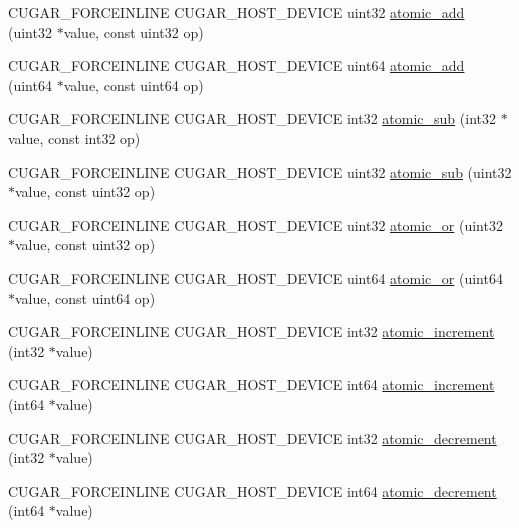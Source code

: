\begin{DoxyCompactItemize}
\item 
C\+U\+G\+A\+R\+\_\+\+F\+O\+R\+C\+E\+I\+N\+L\+I\+NE C\+U\+G\+A\+R\+\_\+\+H\+O\+S\+T\+\_\+\+D\+E\+V\+I\+CE uint32 \hyperlink{group___atomics_ga130aea0c6d0c91af08bea4b52d6a8208}{atomic\+\_\+add} (uint32 $\ast$value, const uint32 op)
\item 
C\+U\+G\+A\+R\+\_\+\+F\+O\+R\+C\+E\+I\+N\+L\+I\+NE C\+U\+G\+A\+R\+\_\+\+H\+O\+S\+T\+\_\+\+D\+E\+V\+I\+CE uint64 \hyperlink{group___atomics_gaed434d4f310d826a6e39932269de15c4}{atomic\+\_\+add} (uint64 $\ast$value, const uint64 op)
\item 
C\+U\+G\+A\+R\+\_\+\+F\+O\+R\+C\+E\+I\+N\+L\+I\+NE C\+U\+G\+A\+R\+\_\+\+H\+O\+S\+T\+\_\+\+D\+E\+V\+I\+CE int32 \hyperlink{group___atomics_ga3efc1d5c63f30d1ee11887f76744bafe}{atomic\+\_\+sub} (int32 $\ast$value, const int32 op)
\item 
C\+U\+G\+A\+R\+\_\+\+F\+O\+R\+C\+E\+I\+N\+L\+I\+NE C\+U\+G\+A\+R\+\_\+\+H\+O\+S\+T\+\_\+\+D\+E\+V\+I\+CE uint32 \hyperlink{group___atomics_ga9d9415fae4e05362c8d6f43d2fd61c60}{atomic\+\_\+sub} (uint32 $\ast$value, const uint32 op)
\item 
C\+U\+G\+A\+R\+\_\+\+F\+O\+R\+C\+E\+I\+N\+L\+I\+NE C\+U\+G\+A\+R\+\_\+\+H\+O\+S\+T\+\_\+\+D\+E\+V\+I\+CE uint32 \hyperlink{group___atomics_ga4b242819dd9c2a9986e0ea35b4883f67}{atomic\+\_\+or} (uint32 $\ast$value, const uint32 op)
\item 
C\+U\+G\+A\+R\+\_\+\+F\+O\+R\+C\+E\+I\+N\+L\+I\+NE C\+U\+G\+A\+R\+\_\+\+H\+O\+S\+T\+\_\+\+D\+E\+V\+I\+CE uint64 \hyperlink{group___atomics_ga5d15edb3c64f3cde839eb76c54aacf7c}{atomic\+\_\+or} (uint64 $\ast$value, const uint64 op)
\item 
C\+U\+G\+A\+R\+\_\+\+F\+O\+R\+C\+E\+I\+N\+L\+I\+NE C\+U\+G\+A\+R\+\_\+\+H\+O\+S\+T\+\_\+\+D\+E\+V\+I\+CE int32 \hyperlink{group___atomics_ga3034bbde9594dc3c4894fe31ad5a0b3c}{atomic\+\_\+increment} (int32 $\ast$value)
\item 
C\+U\+G\+A\+R\+\_\+\+F\+O\+R\+C\+E\+I\+N\+L\+I\+NE C\+U\+G\+A\+R\+\_\+\+H\+O\+S\+T\+\_\+\+D\+E\+V\+I\+CE int64 \hyperlink{group___atomics_ga57595e5240e01e562a47816a82e14dd2}{atomic\+\_\+increment} (int64 $\ast$value)
\item 
C\+U\+G\+A\+R\+\_\+\+F\+O\+R\+C\+E\+I\+N\+L\+I\+NE C\+U\+G\+A\+R\+\_\+\+H\+O\+S\+T\+\_\+\+D\+E\+V\+I\+CE int32 \hyperlink{group___atomics_ga60cd477d17c1ff78aa673ce06b60b569}{atomic\+\_\+decrement} (int32 $\ast$value)
\item 
C\+U\+G\+A\+R\+\_\+\+F\+O\+R\+C\+E\+I\+N\+L\+I\+NE C\+U\+G\+A\+R\+\_\+\+H\+O\+S\+T\+\_\+\+D\+E\+V\+I\+CE int64 \hyperlink{group___atomics_gae94ecfb92e8d261326f527daa39c770d}{atomic\+\_\+decrement} (int64 $\ast$value)

\end{DoxyCompactItemize}
